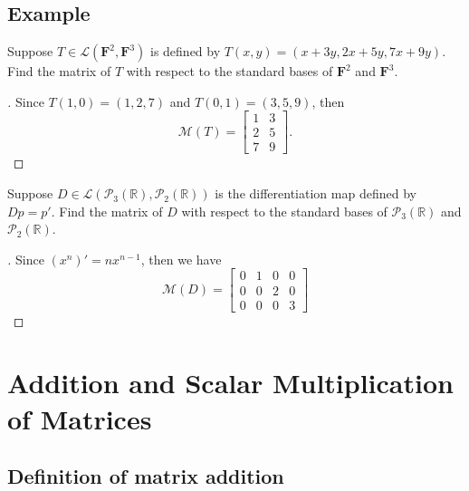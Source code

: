 \documentclass[11pt]{article}
\begin{document}
    \subsection{Example}
    Suppose \(T \in \mathcal{L}(\textbf{F}^2, \textbf{F}^3)\) is defined by \(T(x,y) = (x+3y, 2x+5y, 7x + 9y).\) Find the matrix of $T$ with respect to the standard bases of \(\textbf{F}^2\) and \(\textbf{F}^3\). 

    \begin{proof}[\unskip\nopunct]
        Since \(T(1,0) = (1,2,7)\) and \(T(0,1) = (3,5,9)\), then
        \begin{equation*}
            \mathcal{M}(T) = \begin{bmatrix}
                               1 & 3 \\
                               2 & 5 \\
                               7 & 9
                             \end{bmatrix}.
        \end{equation*}
    \end{proof}
    Suppose \(D \in \mathcal{L}(\mathcal{P}_3 (\mathbb{R}), \mathcal{P}_2 (\mathbb{R}))\) is the differentiation map defined by \(Dp = p'\). Find the matrix of $D$ with respect to the standard bases of \(\mathcal{P}_3 (\mathbb{R})\) and \(\mathcal{P}_2 (\mathbb{R})\).

    \begin{proof}[\unskip\nopunct]
        Since \((x^n)' = nx^{n-1}\), then we have
        \begin{equation*}
            \mathcal{M}(D) = \begin{bmatrix}
                                0 & 1 & 0 & 0 \\
                                0 & 0 & 2 & 0 \\
                                0 & 0 & 0 & 3
                             \end{bmatrix}
        \end{equation*}
    \end{proof}

    \section{Addition and Scalar Multiplication of Matrices}

    \subsection{Definition of matrix addition}
\end{document}
